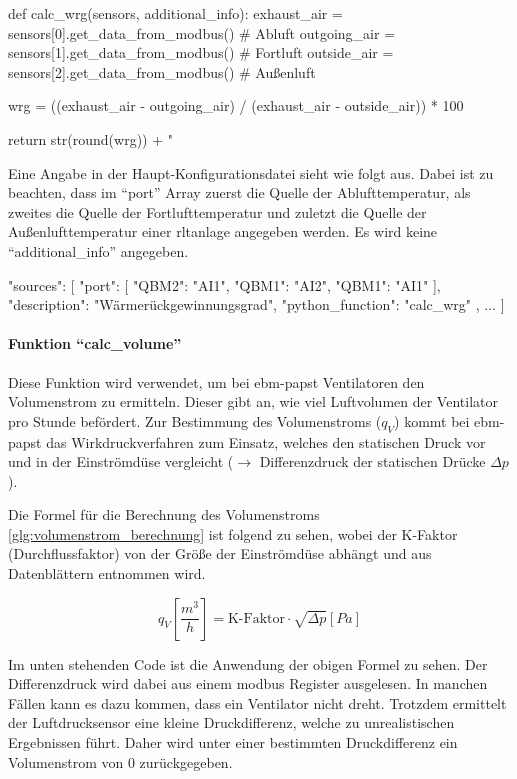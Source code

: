 \begin{pythoncode}
def calc_wrg(sensors, additional_info):
	exhaust_air = sensors[0].get_data_from_modbus()  # Abluft
	outgoing_air = sensors[1].get_data_from_modbus()  # Fortluft
	outside_air = sensors[2].get_data_from_modbus()  # Außenluft
	
	wrg = ((exhaust_air - outgoing_air) / (exhaust_air - outside_air)) * 100
	
	return str(round(wrg)) + " %
\end{pythoncode}

Eine Angabe in der Haupt-Konfigurationsdatei sieht wie folgt aus. Dabei ist zu beachten, dass im \enquote{port} Array zuerst die Quelle der Ablufttemperatur, als zweites die Quelle der Fortlufttemperatur und zuletzt die Quelle der Außenlufttemperatur einer \acs{rltanlage} angegeben werden. Es wird keine \enquote{additional\_info} angegeben.

\begin{jsoncode}
	"sources": [
	{
		"port": [
			{"QBM2": "AI1"},
			{"QBM1": "AI2"},
			{"QBM1": "AI1"}
		],
		"description": "Wärmerückgewinnungsgrad",
		"python_function": "calc_wrg"
	},
	...
	]
\end{jsoncode}



\paragraph{Funktion \enquote{calc\_volume}}
Diese Funktion wird verwendet, um bei ebm-papst Ventilatoren den Volumenstrom zu ermitteln. Dieser gibt an, wie viel Luftvolumen der Ventilator pro Stunde befördert. Zur Bestimmung des Volumenstroms ($q_{V}$) kommt bei ebm-papst das Wirkdruckverfahren zum Einsatz, welches den statischen Druck vor und in der Einströmdüse vergleicht ($\rightarrow$ Differenzdruck der statischen Drücke $\Delta p$).

Die Formel für die Berechnung des Volumenstroms \eqref{glg:volumenstrom_berechnung} ist folgend zu sehen, wobei der K-Faktor (Durchflussfaktor) \cite[vgl.][]{rox_klimatechnik:o.J.} von der Größe der Einströmdüse abhängt und aus Datenblättern entnommen wird. \cite[vgl.][171]{ebmpapst:2021}

\begin{equation}
	q_{V}\left[\frac{m^{3}}{h}\right] = \text{K-Faktor} \cdot \sqrt{\Delta p} \left[Pa\right]
	\label{glg:volumenstrom_berechnung}
\end{equation} 

Im unten stehenden Code ist die Anwendung der obigen Formel zu sehen. Der Differenzdruck wird dabei aus einem \gls{modbus} Register ausgelesen. In manchen Fällen kann es dazu kommen, dass ein Ventilator nicht dreht. Trotzdem ermittelt der Luftdrucksensor eine kleine Druckdifferenz, welche zu unrealistischen Ergebnissen führt. Daher wird unter einer bestimmten Druckdifferenz ein Volumenstrom von 0 zurückgegeben.

